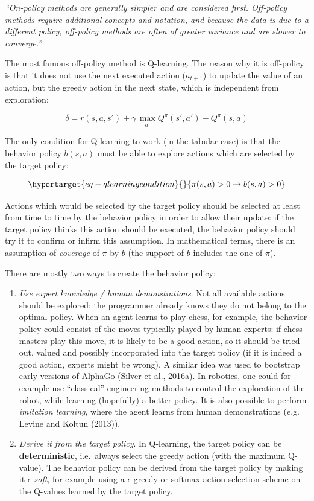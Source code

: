 \documentclass[
  letterpaper,
  DIV=11,
  numbers=noendperiod]{scrreprt}
\begin{document}
\emph{``On-policy methods are generally simpler and are considered
first. Off-policy methods require additional concepts and notation, and
because the data is due to a different policy, off-policy methods are
often of greater variance and are slower to converge.''}

The most famous off-policy method is Q-learning. The reason why it is
off-policy is that it does not use the next executed action
(\(a_{t+1}\)) to update the value of an action, but the greedy action in
the next state, which is independent from exploration:

\[
    \delta = r(s, a, s') + \gamma \, \max_{a'} Q^\pi(s', a') - Q^\pi(s, a)
\]

The only condition for Q-learning to work (in the tabular case) is that
the behavior policy \(b(s,a)\) must be able to explore actions which are
selected by the target policy:

\begin{equation}\protect\hypertarget{eq-qlearningcondition}{}{
    \pi(s, a) > 0 \rightarrow b(s, a) > 0
}\label{eq-qlearningcondition}\end{equation}

Actions which would be selected by the target policy should be selected
at least from time to time by the behavior policy in order to allow
their update: if the target policy thinks this action should be
executed, the behavior policy should try it to confirm or infirm this
assumption. In mathematical terms, there is an assumption of
\emph{coverage} of \(\pi\) by \(b\) (the support of \(b\) includes the
one of \(\pi\)).

There are mostly two ways to create the behavior policy:

\begin{enumerate}
\def\labelenumi{\arabic{enumi}.}
\item
  \emph{Use expert knowledge / human demonstrations}. Not all available
  actions should be explored: the programmer already knows they do not
  belong to the optimal policy. When an agent learns to play chess, for
  example, the behavior policy could consist of the moves typically
  played by human experts: if chess masters play this move, it is likely
  to be a good action, so it should be tried out, valued and possibly
  incorporated into the target policy (if it is indeed a good action,
  experts might be wrong). A similar idea was used to bootstrap early
  versions of AlphaGo (Silver et al., 2016a). In robotics, one could for
  example use ``classical'' engineering methods to control the
  exploration of the robot, while learning (hopefully) a better policy.
  It is also possible to perform \emph{imitation learning}, where the
  agent learns from human demonstrations (e.g. Levine and Koltun
  (2013)).
\item
  \emph{Derive it from the target policy}. In Q-learning, the target
  policy can be \textbf{deterministic}, i.e.~always select the greedy
  action (with the maximum Q-value). The behavior policy can be derived
  from the target policy by making it \emph{\(\epsilon\)-soft}, for
  example using a \(\epsilon\)-greedy or softmax action selection scheme
  on the Q-values learned by the target policy.
\end{enumerate}
\end{document}
